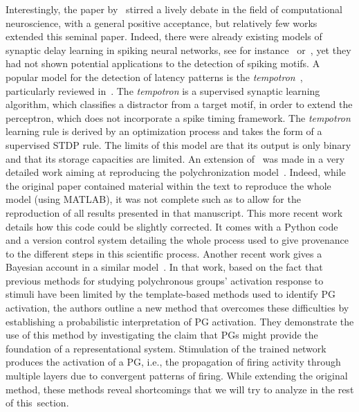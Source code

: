 \documentclass[brainsci, %
               review,accept,pdftex,moreauthors
               ]{Definitions/mdpi}
\begin{document}
% 

Interestingly, the paper by~\citep{izhikevich_polychronization_2006} stirred a lively debate in the field of computational neuroscience, with a general positive acceptance, but relatively few works extended this seminal paper. Indeed, there were already existing models of synaptic delay learning in spiking neural networks, see for instance~\citep{huning_synaptic_1998} or~\citep{eurich_dynamics_1999}, yet they had not shown potential applications to the detection of spiking motifs. A popular model for the detection of latency patterns is the \emph{tempotron}~\citep{gutig_tempotron_2006}, particularly reviewed in~\citep{gutig_spike_2014}. The \emph{tempotron} is a supervised synaptic learning algorithm, which classifies a distractor from a target motif, in order to extend the perceptron, which does not incorporate a spike timing framework. The \emph{tempotron} learning rule is derived by an optimization process and takes the form of a supervised STDP rule. The limits of this model are that its output is only binary and that its storage capacities are limited. An extension of~\citep{izhikevich_polychronization_2006} was made in a very detailed work aiming at reproducing the polychronization model~\citep{pauli_reproducing_2018}. Indeed, while the original paper contained material within the text to reproduce the whole model (using MATLAB), it was not complete such as to allow for the reproduction of all results presented in that manuscript. This more recent work details how this code could be slightly corrected. It comes with a Python code and a version control system detailing the whole process used to give provenance to the different steps in this scientific process. Another recent work gives a Bayesian account in a similar model~\citep{guise_bayesian_2014}. In that work, based on the fact that previous methods for studying polychronous groups' activation response to stimuli have been limited by the template-based methods used to identify PG activation, the authors outline a new method that overcomes these difficulties by establishing a probabilistic interpretation of PG activation. They demonstrate the use of this method by investigating the claim that PGs might provide the foundation of a representational system. Stimulation of the trained network produces the activation of a PG, i.e., the propagation of firing activity through multiple layers due to convergent patterns of firing. While extending the original method, these methods reveal shortcomings that we will try to analyze in the rest of this~section.
\end{document}
